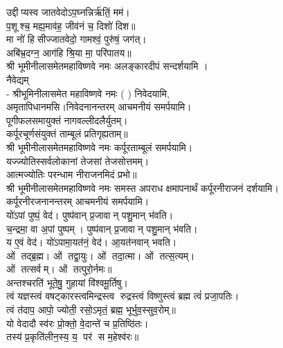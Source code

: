 उद्दीप्यस्व जातवेदोऽप॒घ्नन्निर्ऋ॑तिं॒ मम॑।\\
 प॒शूश्च॒ मह्य॒माव॑ह॒ जीव॑नं च॒ दिशो॑ दिश॥ \\
मा नो॑ हिसीज्जातवेदो॒ गामश्वं॒ पुरु॑षं॒ जग॑त्।\\
अबि॑भ्र॒दग्न॒ आग॑हि श्रि॒या मा॒ परि॑पातय॥ \\
श्री भूमीनीलासमेतमहाविष्णवे नमः अलङ्कारदीपं सन्दर्शयामि ।\\

नैवेद्यम्\\
- श्रीभूमिनीलासमेत महाविष्णवे नमः (	) निवेदयामि, \\
अमृतापिधानमसि।निवेदनानन्तरम् आचमनीयं समर्पयामि।\\

पूगीफलसमायुक्तं नागवल्लीदलैर्युतम्।\\
कर्पूरचूर्णसंयुक्तं ताम्बूलं प्रतिगृह्यताम्॥\\
श्री भूमीनीलासमेतमहाविष्णवे नमः कर्पूरताम्बूलं समर्पयामि।\\

यज्ज्योतिस्सर्वलोकानां तेजसां तेजसोत्तमम्।\\
आत्मज्योतिः परन्धाम नीराजनमिदं प्रभो॥\\
श्री भूमीनीलासमेतमहाविष्णवे नमः समस्त अपराध क्षमापनार्थं कर्पूरनीराजनं दर्शयामि।\\
कर्पूरनीरजनानन्तरम् आचमनीयं समर्पयामि।\\

 यो॑ऽपां पुष्पं॒ वेद॑। पुष्प॑वान् प्र॒जावान् पशु॒मान् भ॑वति।\\
च॒न्द्रमा॒ वा अ॒पां पुष्पम्। पुष्प॑वान् प्र॒जावान् पशु॒मान् भ॑वति।\\
य ए॒वं वेद॑। यो॑ऽपामा॒यत॑नं॒ वेद॑। आ॒यत॑नवान् भवति।\\

ओं तद्ब्र॒ह्म। ओं तद्वा॒युः। ओं तदा॒त्मा। ओं तत्स॒त्यम्‌।\\
ओं तत्सर्वम्‌। ओं तत्पुरो॒र्नमः॥\\

अन्तश्चरति॑ भूते॒षु॒ गुहायां वि॑श्वमू॒र्तिषु। \\
त्वं यज्ञस्त्वं वषट्कारस्त्वमिन्द्रस्त्व रुद्रस्त्वं विष्णुस्त्वं ब्रह्म त्वं॑ प्रजा॒पतिः। \\
त्वं त॑दाप॒ आपो॒ ज्योती॒ रसो॒ऽमृतं॒ ब्रह्म॒ भूर्भुव॒स्सुव॒रोम्‌॥\\

यो वेदादौ स्व॑रः प्रो॒क्तो॒ वे॒दान्ते॑ च प्र॒तिष्ठि॑तः।\\
तस्य॑ प्र॒कृति॑लीन॒स्य॒ य॒ पर॑ स म॒हेश्व॑रः॥\\

